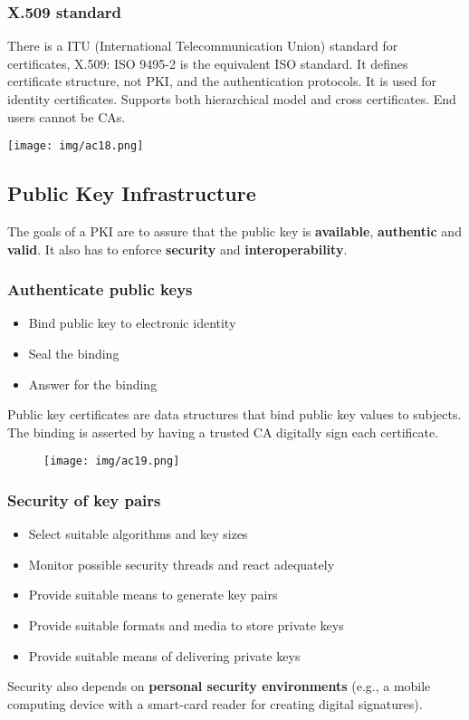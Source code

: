 \documentclass[a4paper, 10pt, titlepage]{article}
\begin{document}
\subsubsection*{X.509 standard}
There is a ITU (International Telecommunication Union) standard for certificates, X.509: ISO 9495-2 is the equivalent ISO standard. It defines certificate structure, not PKI, and the authentication protocols. It is used for identity certificates.
Supports both hierarchical model and cross certificates. End users cannot be CAs.
\begin{center}
\texttt{[image: img/ac18.png]}
\end{center}

\subsection{Public Key Infrastructure}
The goals of a PKI are to assure that the public key is \textbf{available}, \textbf{authentic} and \textbf{valid}. It also has to enforce \textbf{security} and \textbf{interoperability}.

\subsubsection{Authenticate public keys}
\begin{itemize}
\item Bind public key to electronic identity
\item Seal the binding
\item Answer for the binding
\end{itemize}
Public key certificates are data structures that bind public key values to subjects. The binding is asserted by having a trusted CA digitally sign each certificate.
\begin{figure}[h]
\centering
\texttt{[image: img/ac19.png]}
\end{figure}

\subsubsection{Security of key pairs}
\begin{itemize}
\item Select suitable algorithms and key sizes
\item Monitor possible security threads and react adequately
\item Provide suitable means to generate key pairs
\item Provide suitable formats and media to store private keys
\item Provide suitable means of delivering private keys
\end{itemize}
Security also depends on \textbf{personal security environments} (e.g., a mobile computing device with a smart-card reader for creating digital signatures).
\end{document}
